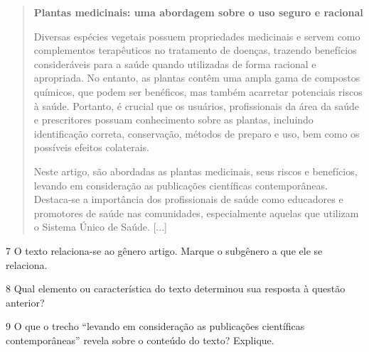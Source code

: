 \begin{quote}
\centering\textbf{Plantas medicinais: uma abordagem sobre o uso seguro e racional}


Diversas espécies vegetais possuem propriedades medicinais e servem como
complementos terapêuticos no tratamento de doenças, trazendo benefícios
consideráveis para a saúde quando utilizadas de forma racional e
apropriada. No entanto, as plantas contêm uma ampla gama de compostos
químicos, que podem ser benéficos, mas também acarretar potenciais
riscos à saúde. Portanto, é crucial que os usuários, profissionais da
área da saúde e prescritores possuam conhecimento sobre as plantas,
incluindo identificação correta, conservação, métodos de preparo e
uso, bem como os possíveis efeitos colaterais.

Neste artigo, são abordadas as plantas medicinais, seus riscos e
benefícios, levando em consideração as publicações científicas
contemporâneas. Destaca-se a importância dos profissionais de saúde como
educadores e promotores de saúde nas comunidades, especialmente aquelas
que utilizam o Sistema Único de Saúde. [...]

\end{quote}

\num{7} O texto relaciona-se ao gênero artigo. Marque o subgênero a que
ele se relaciona.

\begin{boxlist}
\boxitem{\rosa{X} Artigo científico.
\boxitem{\white{X}} Artigo de opinião.
\end{boxlist}

\num{8} Qual elemento ou característica do texto determinou sua resposta à questão anterior?


\num{9} O que o trecho ``levando em consideração as publicações
científicas contemporâneas'' revela sobre o conteúdo do texto? Explique.


